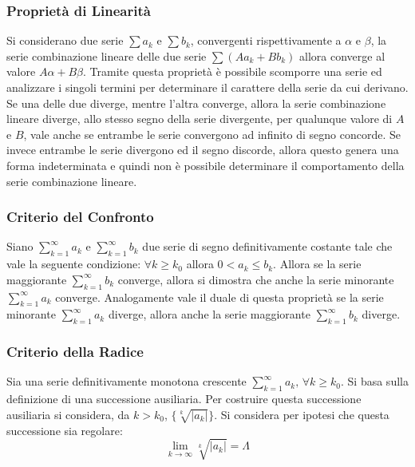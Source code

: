 \documentclass{article}
\numberwithin{equation}{subsection}
\begin{document}
\subsubsection{Proprietà di Linearità}

Si considerano due serie $\sum a_k$ e $\sum b_k$, convergenti rispettivamente a $\alpha$ e $\beta$, la serie combinazione lineare delle due serie $\sum(Aa_k+Bb_k)$ allora converge al valore $A\alpha+B\beta$. Tramite questa proprietà è possibile scomporre una serie ed analizzare i singoli termini per determinare il carattere della serie da cui derivano. Se una delle due diverge, mentre l'altra converge, allora la serie combinazione lineare diverge, allo stesso segno della serie divergente, per qualunque valore di $A$ e $B$, vale anche se entrambe le serie convergono ad infinito di segno concorde. Se invece entrambe le serie divergono ed il segno discorde, allora questo genera una forma indeterminata e quindi non è possibile determinare il comportamento della serie combinazione lineare. 

\subsubsection{Criterio del Confronto}

Siano $\sum_{k=1}^\infty a_k$ e $\sum_{k=1}^\infty b_k$ due serie di segno definitivamente costante tale che vale la seguente condizione: $\forall k\geq k_0$ allora $0<a_k\leq b_k$. Allora se la serie maggiorante $\sum_{k=1}^\infty b_k$ converge, allora si dimostra che anche la serie minorante $\sum_{k=1}^\infty a_k$ converge. Analogamente vale il duale di questa proprietà se la serie minorante $\sum_{k=1}^\infty a_k$ diverge, allora anche la serie maggiorante $\sum_{k=1}^\infty b_k$ diverge.

\subsubsection{Criterio della Radice}

Sia una serie definitivamente monotona crescente $\sum_{k=1}^\infty a_k,\,\forall k\geq k_0$. 
Si basa sulla definizione di una successione ausiliaria. Per costruire questa successione ausiliaria si considera, da $k>k_0$, $\{\sqrt[k]{|a_k|}\}$. Si considera per ipotesi che questa successione sia regolare:
\begin{equation*}
    \lim_{k\to\infty}\sqrt[k]{|a_k|}=\Lambda
\end{equation*}
\end{document}
